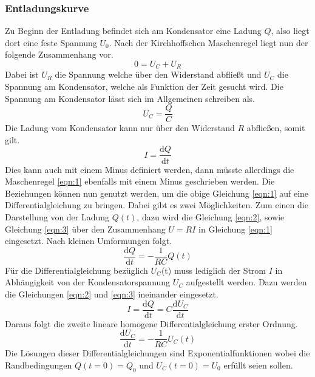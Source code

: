 \subsubsection{Entladungskurve}
Zu Beginn der Entladung befindet sich am Kondensator eine Ladung $Q$, also liegt dort eine feste Spannung $U_{0}$. 
Nach der Kirchhoffschen Maschenregel liegt nun der folgende Zusammenhang vor.
\begin{equation}
\label{eqn:1}
    0 = U_{C} + U_{R}
\end{equation}
Dabei ist $U_{R}$ die Spannung welche über den Widerstand abfließt und $U_{C}$ die Spannung am Kondensator, welche als Funktion der Zeit gesucht wird. 
Die Spannung am Kondensator lässt sich im Allgemeinen schreiben als.
\begin{equation}
\label{eqn:2}
    U_{C} = \frac{Q}{C}
\end{equation}
Die Ladung vom Kondensator kann nur über den Widerstand $R$ abfließen, somit gilt.
\begin{equation}
\label{eqn:3}
    I = \frac{\text{d}Q}{\text{d}t}
\end{equation}
Dies kann auch mit einem Minus definiert werden, dann müsste allerdings die Maschenregel \eqref{eqn:1} ebenfalls mit einem Minus geschrieben werden.
Die Beziehungen können nun genutzt werden, um die obige Gleichung \eqref{eqn:1} auf eine Differentialgleichung zu bringen. Dabei gibt es zwei Möglichkeiten. Zum einen die Darstellung von der Ladung $Q(t)$, dazu wird die Gleichung \eqref{eqn:2}, sowie Gleichung \eqref{eqn:3} über den Zusammenhang $U = RI$ in Gleichung \eqref{eqn:1} eingesetzt. Nach kleinen Umformungen folgt.
\begin{equation}
    \frac{\text{d}Q}{\text{d}t} = - \frac{1}{RC} Q(t)
\end{equation}
Für die Differentialgleichung bezüglich $U_{C}$(t) muss lediglich der Strom $I$ in Abhängigkeit von der Kondensatorspannung $U_{C}$ aufgestellt werden. Dazu werden die Gleichungen \eqref{eqn:2} und \eqref{eqn:3} ineinander eingesetzt.
\begin{equation}
    I = \frac{\text{d}Q}{\text{d}t} = C \frac{\text{d}U_{C}}{\text{d}t}
\end{equation}
Daraus folgt die zweite lineare homogene Differentialgleichung erster Ordnung.
\begin{equation}
    \frac{\text{d}U_{C}}{\text{d}t} = - \frac{1}{RC} U_{C}(t)
\end{equation}
Die Lösungen dieser Differentialgleichungen sind Exponentialfunktionen wobei die Randbedingungen $Q(t=0) = Q_{0}$ und $U_{C}(t=0) = U_{0}$ erfüllt seien sollen.
